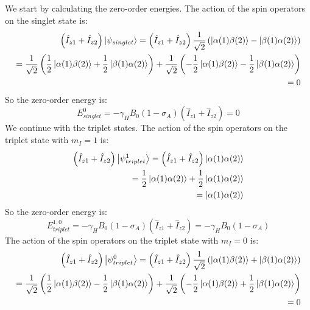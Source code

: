 \documentclass[12pt]{article}
\begin{document}
\subsection{}
We start by calculating the zero-order energies. The action of the spin operators on the singlet state is:
\begin{align}
  \left(\hat{I}_{z 1} + \hat{I}_{z 2}\right) \ket{\psi_{singlet}} = \left(\hat{I}_{z 1} + \hat{I}_{z 2}\right) \frac{1}{\sqrt{2}} \left( \ket{\alpha(1)\beta(2)} - \ket{\beta(1)\alpha(2)} \right)\\
  = \frac{1}{\sqrt{2}} \left( \frac{1}{2} \ket{\alpha(1)\beta(2)} + \frac{1}{2}\ket{\beta(1)\alpha(2)} \right) + \frac{1}{\sqrt{2}} \left( -\frac{1}{2} \ket{\alpha(1)\beta(2)} - \frac{1}{2}\ket{\beta(1)\alpha(2)} \right)\\
  = 0
\end{align}
So the zero-order energy is:
\begin{equation}
  E_{singlet}^{0} = -\gamma_{H} B_{0}\left(1-\sigma_{A}\right)\left(\hat{I}_{z 1}+\hat{I}_{z 2}\right) = 0
\end{equation}
We continue with the triplet states. The action of the spin operators on the triplet state with $m_I = 1$ is:
\begin{align}
  \left(\hat{I}_{z 1} + \hat{I}_{z 2}\right) \ket{\psi_{triplet}^{1}} = \left(\hat{I}_{z 1} + \hat{I}_{z 2}\right) \ket{\alpha(1)\alpha(2)}\\
  = \frac{1}{2} \ket{\alpha(1)\alpha(2)} + \frac{1}{2} \ket{\alpha(1)\alpha(2)}\\
  = \ket{\alpha(1)\alpha(2)}
\end{align}
So the zero-order energy is:
\begin{equation}
  E_{triplet}^{1,0} = -\gamma_{H} B_{0}\left(1-\sigma_{A}\right)\left(\hat{I}_{z 1}+\hat{I}_{z 2}\right) = -\gamma_{H} B_{0}\left(1-\sigma_{A}\right)
\end{equation}
The action of the spin operators on the triplet state with $m_I = 0$ is:
\begin{align}
  \left(\hat{I}_{z 1} + \hat{I}_{z 2}\right) \ket{\psi_{triplet}^{0}} = \left(\hat{I}_{z 1} + \hat{I}_{z 2}\right) \frac{1}{\sqrt{2}} \left( \ket{\alpha(1)\beta(2)} + \ket{\beta(1)\alpha(2)} \right)\\
  = \frac{1}{\sqrt{2}} \left( \frac{1}{2} \ket{\alpha(1)\beta(2)} - \frac{1}{2}\ket{\beta(1)\alpha(2)} \right) + \frac{1}{\sqrt{2}} \left( - \frac{1}{2} \ket{\alpha(1)\beta(2)} + \frac{1}{2}\ket{\beta(1)\alpha(2)} \right)\\
  = 0
\end{align}
\end{document}
